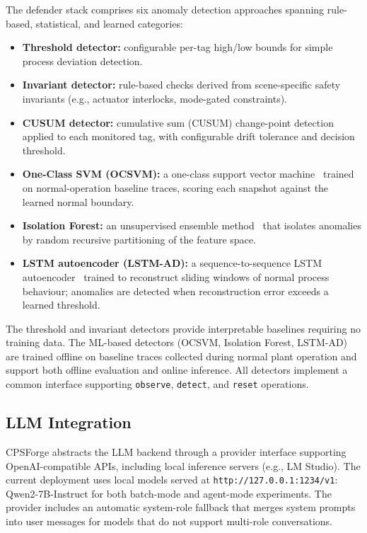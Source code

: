 The defender stack comprises six anomaly detection approaches spanning rule-based, statistical, and learned categories:

\begin{itemize}[leftmargin=1.5em]
    \item \textbf{Threshold detector:} configurable per-tag high/low bounds for simple process deviation detection.
    \item \textbf{Invariant detector:} rule-based checks derived from scene-specific safety invariants (e.g., actuator interlocks, mode-gated constraints).
    \item \textbf{CUSUM detector:} cumulative sum (CUSUM) change-point detection~\cite{page1954continuous} applied to each monitored tag, with configurable drift tolerance and decision threshold.
    \item \textbf{One-Class SVM (OCSVM):} a one-class support vector machine~\cite{scholkopf2001estimating} trained on normal-operation baseline traces, scoring each snapshot against the learned normal boundary.
    \item \textbf{Isolation Forest:} an unsupervised ensemble method~\cite{liu2008isolation} that isolates anomalies by random recursive partitioning of the feature space.
    \item \textbf{LSTM autoencoder (LSTM-AD):} a sequence-to-sequence LSTM autoencoder~\cite{malhotra2016lstm} trained to reconstruct sliding windows of normal process behaviour; anomalies are detected when reconstruction error exceeds a learned threshold.
\end{itemize}

The threshold and invariant detectors provide interpretable baselines requiring no training data. The ML-based detectors (OCSVM, Isolation Forest, LSTM-AD) are trained offline on baseline traces collected during normal plant operation and support both offline evaluation and online inference. All detectors implement a common interface supporting \texttt{observe}, \texttt{detect}, and \texttt{reset} operations.

\subsection{LLM Integration}
\label{sec:impl:llm}

CPSForge abstracts the LLM backend through a provider interface supporting OpenAI-compatible APIs, including local inference servers (e.g., LM Studio). The current deployment uses local models served at \texttt{http://127.0.0.1:1234/v1}: Qwen2-7B-Instruct for both batch-mode and agent-mode experiments. The provider includes an automatic system-role fallback that merges system prompts into user messages for models that do not support multi-role conversations.

